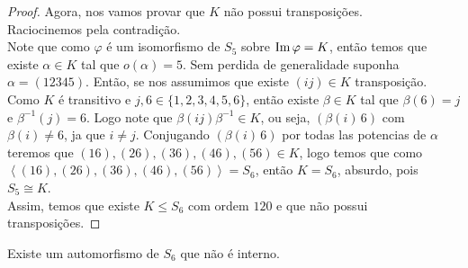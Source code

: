 \begin{proof}
  Agora, nos vamos provar que $K$ não possui transposições.\\
  Raciocinemos pela contradição.\\
  Note que como $\varphi$ é um isomorfismo de $S_5$ sobre $\operatorname{Im}\varphi=K$, então temos que existe $\alpha\in K$ tal que $o(\alpha)=5$. Sem perdida de generalidade suponha $\alpha=(12345)$. Então, se nos assumimos que existe $(ij)\in K$ transposição. Como $K$ é transitivo e $j,6\in\{1,2,3,4,5,6\}$, então existe $\beta\in K$ tal que $\beta(6)=j$ e $\beta^{-1}(j)=6$. Logo note que $\beta(ij)\beta^{-1}\in K$, ou seja, $(\beta(i)\,6)$ com $\beta(i)\neq 6$, ja que $i\neq j$. Conjugando $(\beta(i)\,6)$ por todas las potencias de $\alpha$ teremos que $(16),(26),(36),(46),(56)\in K$, logo temos que como $\left\langle (16),(26),(36),(46),(56) \right\rangle= S_6$, então $K=S_6$, absurdo, pois $S_5\cong K$.\\
  Assim, temos que existe $K\leq S_6$ com ordem $120$ e que não possui transposições. 
\end{proof}
\begin{theorem}\label{th:S-6pronto}
  Existe um automorfismo de $S_6$ que não é interno. 
\end{theorem}
